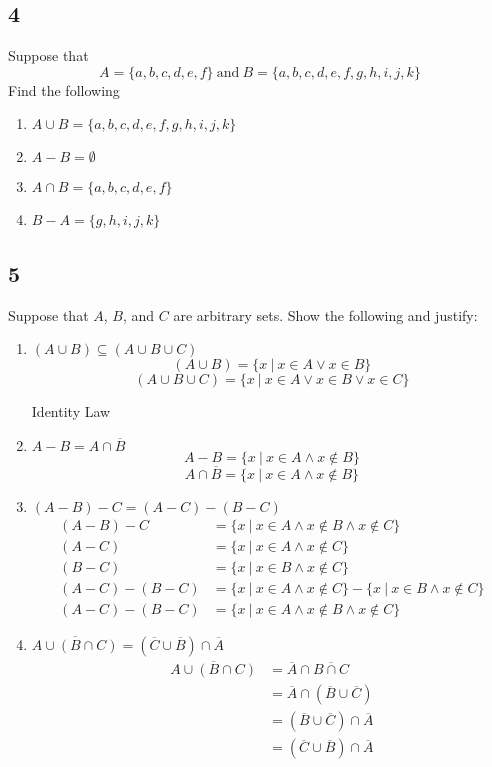 \documentclass[letterpaper, 12pt]{math}
\begin{document}
\subsection*{4}
Suppose that
\[ A = \{a,b,c,d,e,f\}\ \mathrm{and}\ B = \{a,b,c,d,e,f,g,h,i,j,k\} \]
Find the following
\begin{enumerate}
  \item \( A\cup B = \{a,b,c,d,e,f,g,h,i,j,k\} \)
  \item \( A-B = \emptyset \)
  \item \( A\cap B = \{a,b,c,d,e,f\} \)
  \item \( B-A = \{g,h,i,j,k\} \)
\end{enumerate}

\subsection*{5}
Suppose that \( A \), \( B \), and \( C \) are arbitrary sets. Show the
following and justify:
\begin{enumerate}
  \item \( (A\cup B) \subseteq (A\cup B\cup C) \)
  \[ (A\cup B) = \{x\ |\ x \in A \vee x \in B \} \]
  \[ (A\cup B\cup C) = \{x\ |\ x \in A \vee x \in B \vee x \in C\} \]
  \begin{center}
    Identity Law
  \end{center}
  \item \( A-B = A\cap \overline{B} \)
  \[ A-B = \{x\ |\ x \in A \wedge x \notin B\} \]
  \[ A\cap \overline{B} = \{x\ |\ x \in A \wedge x \notin B\} \]
  \item \( (A-B)-C = (A-C)-(B-C) \)
  \begin{align*}
    (A-B)-C &= \{x\ |\ x \in A \wedge x \notin B \wedge x \notin C\} \\
    (A-C) &= \{x\ |\ x \in A \wedge x \notin C\} \\
    (B-C) &= \{x\ |\ x \in B \wedge x \notin C\} \\
    (A-C)-(B-C) &= \{x\ |\ x \in A \wedge x \notin C\}-
     \{x\ |\ x \in B \wedge x \notin C\} \\
    (A-C)-(B-C) &= \{x\ |\ x \in A \wedge x \notin B \wedge x \notin C\}
  \end{align*}
  \item \( \overline{A \cup (B \cap C)} = (\overline{C} \cup \overline{B}) \cap
     \overline{A} \)
  \begin{align*}
    \overline{A \cup (B \cap C)} &=
      \overline{A} \cap \overline{B \cap C} \\
    &= \overline{A} \cap (\overline{B} \cup \overline{C}) \\
    &= (\overline{B} \cup \overline{C}) \cap \overline{A} \\
    &= (\overline{C} \cup \overline{B}) \cap \overline{A}
  \end{align*}
\end{enumerate}
\end{document}
